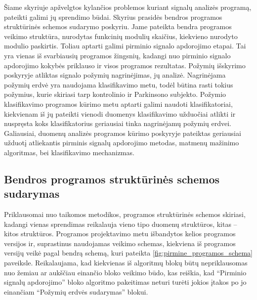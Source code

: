 \documentclass[]{vgtuef}
\begin{document}

Šiame skyriuje apžvelgtos kylančios problemos kuriant signalų analizės programą, pateikti galimi jų sprendimo būdai. Skyrius prasidės bendros programos struktūrinės schemos sudarymo poskyriu. Jame pateikta bendra programos veikimo struktūra, nurodytas funkcinių modulių skaičius, kiekvieno nurodyto modulio paskirtis. Toliau aptarti galimi pirminio signalo apdorojimo etapai. Tai yra vienas iš svarbiausių programos žingsnių, kadangi nuo pirminio signalo apdorojimo kokybės priklauso ir visos programos rezultatas. Požymių išskyrimo poskyryje atliktas signalo požymių nagrinėjimas, jų analizė. Nagrinėjama požymių erdvė yra naudojama klasifikavimo metu, todėl būtina rasti tokius požymius, kurie skiriasi tarp kontrolinio ir Parkinsono subjekto. Požymio klasifikavimo programos kūrimo metu aptarti galimi naudoti klasifikatoriai, kiekvienam iš jų pateikti vienodi duomenys klasifikavimo užduočiai atlikti ir nuspręsta koks klasifikatorius geriausiai tinka nagrinėjamų požymių erdvei. Galiausiai, duomenų analizės programos kūrimo poskyryje pateiktas geriausiai užduotį atliekantis pirminis signalų apdorojimo metodas, matmenų mažinimo algoritmas, bei klasifikavimo mechanizmas.

\subsection{Bendros programos struktūrinės schemos sudarymas}




Priklausomai nuo taikomos metodikos, programos struktūrinės schemos skiriasi, kadangi vienas sprendimas reikalauja vieno tipo duomenų struktūros, kitas -- kitos struktūros. Programos projektavimo metu išbandytos kelios programos versijos ir, suprastinus naudojamas veikimo schemas, kiekviena iš programos versijų veikė pagal bendrą schemą, kuri pateikta \ref{fig:pirmine_programos_schema} paveiksle. Reikalaujama, kad kiekvienas iš algoritmų blokų būtų nepriklausomas nuo žemiau ar aukščiau einančio bloko veikimo būdo, kas reiškia, kad ``Pirminio signalų apdorojimo'' bloko algoritmo pakeitimas neturi turėti jokios įtakos po jo einančiam ``Požymių erdvės sudarymas'' blokui. 
\end{document}
